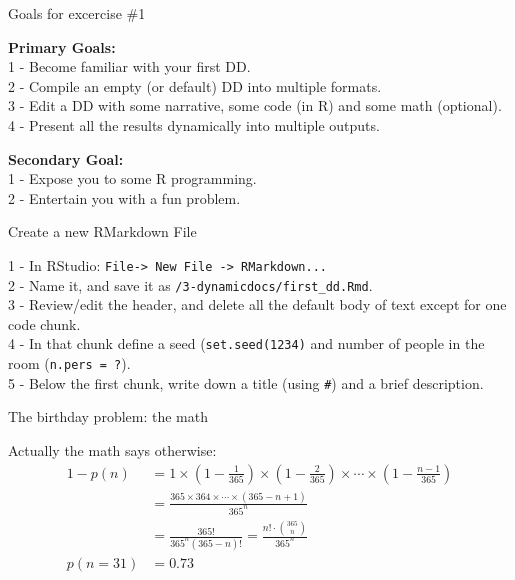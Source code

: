 \documentclass[ignorenonframetext,]{beamer}
\begin{document}
\begin{frame}{Goals for excercise \#1}
\protect\hypertarget{goals-for-excercise-1}{}

\textbf{Primary Goals:}\\
1 - Become familiar with your first DD.\\
2 - Compile an empty (or default) DD into multiple formats.\\
3 - Edit a DD with some narrative, some code (in R) and some math
(optional).\\
4 - Present all the results dynamically into multiple outputs.

\pause

\textbf{Secondary Goal:}\\
1 - Expose you to some R programming.\\
2 - Entertain you with a fun problem.

\end{frame}

\begin{frame}[fragile]{Create a new RMarkdown File}
\protect\hypertarget{create-a-new-rmarkdown-file}{}

1 - In RStudio:
\texttt{File-\textgreater{}\ New\ File\ -\textgreater{}\ RMarkdown...}\\
2 - Name it, and save it as \texttt{/3-dynamicdocs/first\_dd.Rmd}.\\
3 - Review/edit the header, and delete all the default body of text
except for one code chunk.\\
4 - In that chunk define a seed (\texttt{set.seed(1234)} and number of
people in the room (\texttt{n.pers\ =\ ?}).\\
5 - Below the first chunk, write down a title (using \texttt{\#}) and a
brief description.

\end{frame}

\begin{frame}{The birthday problem: the math}
\protect\hypertarget{the-birthday-problem-the-math}{}

Actually the math says otherwise: \begin{align} 
 1 -  p(n) &= 1 \times \left(1-\frac{1}{365}\right) \times \left(1-\frac{2}{365}\right) \times \cdots \times \left(1-\frac{n-1}{365}\right) \nonumber  \\  &= \frac{ 365 \times 364 \times \cdots \times (365-n+1) }{ 365^n } \nonumber \\ &= \frac{ 365! }{ 365^n (365-n)!} = \frac{n!\cdot\binom{365}{n}}{365^n}\\
p(n= 31) &= 0.73  \nonumber
\end{align}

\end{frame}
\end{document}
